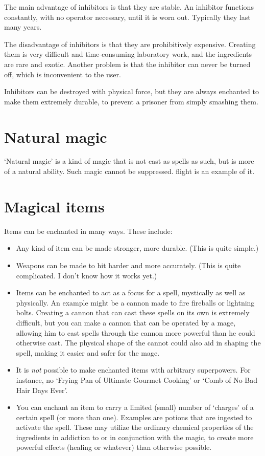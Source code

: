 The main advantage of inhibitors is that they are stable. An inhibitor functions constantly, with no operator necessary, until it is worn out. Typically they last many years. 

The disadvantage of inhibitors is that they are prohibitively expensive. Creating them is very difficult and time-consuming laboratory work, and the ingredients are rare and exotic. Another problem is that the inhibitor can never be turned off, which is inconvenient to the user. 

Inhibitors can be destroyed with physical force, but they are always enchanted to make them extremely durable, to prevent a prisoner from simply smashing them.



\section{Natural magic}
`Natural magic' is a kind of magic that is not cast as spells as such, but is more of a natural ability. Such magic cannot be suppressed. \dragon{} flight is an example of it. 



\section{Magical items}
Items can be enchanted in many ways. These include:

\begin{itemize}
  \item 
    Any kind of item can be made stronger, more durable. (This is quite simple.)
  \item 
    Weapons can be made to hit harder and more accurately. (This is quite complicated. I don't know how it works yet.)
  \item 
    Items can be enchanted to act as a focus for a spell, mystically as well as physically. An example might be a cannon made to fire fireballs or lightning bolts. Creating a cannon that can cast these spells on its own is extremely difficult, but you can make a cannon that can be operated by a mage, allowing him to cast spells through the cannon more powerful than he could otherwise cast. The physical shape of the cannot could also aid in shaping the spell, making it easier and safer for the mage. 
  \item 
    It is \emph{not} possible to make enchanted items with arbitrary superpowers. For instance, no `Frying Pan of Ultimate Gourmet Cooking' or `Comb of No Bad Hair Days Ever'.
  \item 
    You can enchant an item to carry a limited (small) number of `charges' of a certain spell (or more than one). Examples are potions that are ingested to activate the spell. These may utilize the ordinary chemical properties of the ingredients in addiction to or in conjunction with the magic, to create more powerful effects (healing or whatever) than otherwise possible. 
\end{itemize}

